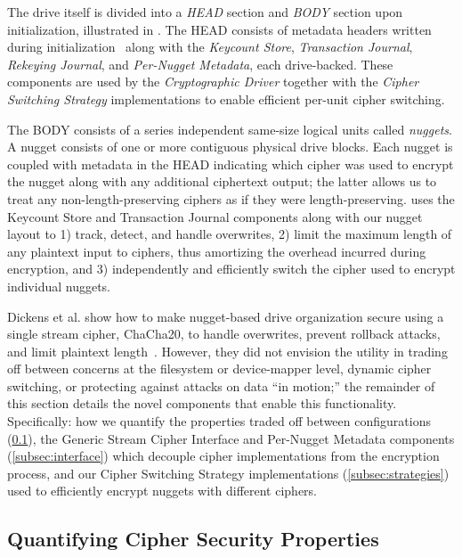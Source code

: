 The drive itself is divided into a \emph{HEAD} section and \emph{BODY} section
upon initialization, illustrated in . The HEAD consists of
metadata headers written during initialization~\cite{StrongBox} along with the
\emph{Keycount Store}, \emph{Transaction Journal}, \emph{Rekeying Journal}, and
\emph{Per-Nugget Metadata}, each drive-backed. These components are used by the
\emph{Cryptographic Driver} together with the \emph{Cipher Switching Strategy}
implementations to enable efficient per-unit cipher switching.

The BODY consists of a series independent same-size logical units called
\emph{nuggets}. A nugget consists of one or more contiguous physical drive
blocks. Each nugget is coupled with metadata in the HEAD indicating which cipher
was used to encrypt the nugget along with any additional ciphertext output; the
latter allows us to treat any non-length-preserving ciphers as if they were
length-preserving. \sys uses the Keycount Store and Transaction Journal
components along with our nugget layout to 1) track, detect, and handle
overwrites, 2) limit the maximum length of any plaintext input to ciphers, thus
amortizing the overhead incurred during encryption, and 3) independently and
efficiently switch the cipher used to encrypt individual nuggets.

Dickens et al. show  how to make nugget-based drive organization secure using a
single stream cipher, ChaCha20, to handle overwrites, prevent rollback attacks,
and limit plaintext length~\cite{StrongBox}. However, they did not envision the
utility in trading off between concerns at the filesystem or device-mapper
level, dynamic cipher switching, or protecting against attacks on data ``in
motion;'' the remainder of this section details the novel components that enable
this functionality. Specifically: how we quantify the properties traded off
between configurations (\cref{subsec:quantify}), the Generic Stream Cipher
Interface and Per-Nugget Metadata components (\cref{subsec:interface}) which
decouple cipher implementations from the encryption process, and our Cipher
Switching Strategy implementations (\cref{subsec:strategies}) used to
efficiently encrypt nuggets with different ciphers.

\subsection{Quantifying Cipher Security Properties} \label{subsec:quantify}

